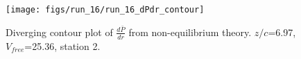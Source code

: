 \begin{figure}[H]
\centering
\texttt{[image: figs/run\_16/run\_16\_dPdr\_contour]}
\caption{Diverging contour plot of $\frac{d\bar{P}}{dr}$ from non-equilibrium theory. $z/c$=6.97, $V_{free}$=25.36, station 2.}
\label{fig:run_16_dPdr_contour}
\end{figure}


